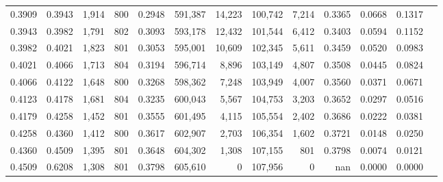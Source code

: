 \begin{tabular}{rrrrrrrrrrrrr}
0.3909 & 0.3943 &  1,914 & 800 &                                     0.2948 & 591,387 &  14,223 & 100,742 &   7,214 & 0.3365 & 0.0668 & 0.1317 \\
0.3943 & 0.3982 &  1,791 & 802 &                                     0.3093 & 593,178 &  12,432 & 101,544 &   6,412 & 0.3403 & 0.0594 & 0.1152 \\
0.3982 & 0.4021 &  1,823 & 801 &                                     0.3053 & 595,001 &  10,609 & 102,345 &   5,611 & 0.3459 & 0.0520 & 0.0983 \\
0.4021 & 0.4066 &  1,713 & 804 &                                     0.3194 & 596,714 &   8,896 & 103,149 &   4,807 & 0.3508 & 0.0445 & 0.0824 \\
0.4066 & 0.4122 &  1,648 & 800 &                                     0.3268 & 598,362 &   7,248 & 103,949 &   4,007 & 0.3560 & 0.0371 & 0.0671 \\
0.4123 & 0.4178 &  1,681 & 804 &                                     0.3235 & 600,043 &   5,567 & 104,753 &   3,203 & 0.3652 & 0.0297 & 0.0516 \\
0.4179 & 0.4258 &  1,452 & 801 &                                     0.3555 & 601,495 &   4,115 & 105,554 &   2,402 & 0.3686 & 0.0222 & 0.0381 \\
0.4258 & 0.4360 &  1,412 & 800 &                                     0.3617 & 602,907 &   2,703 & 106,354 &   1,602 & 0.3721 & 0.0148 & 0.0250 \\
0.4360 & 0.4509 &  1,395 & 801 &                                     0.3648 & 604,302 &   1,308 & 107,155 &     801 & 0.3798 & 0.0074 & 0.0121 \\
0.4509 & 0.6208 &  1,308 & 801 &                                     0.3798 & 605,610 &       0 & 107,956 &       0 &    nan & 0.0000 & 0.0000 \\
\bottomrule
\end{tabular}
